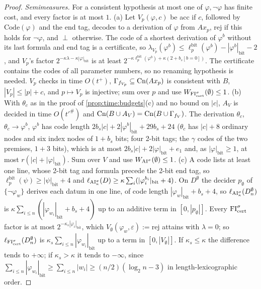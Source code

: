 \begin{proof}
\emph{Semimeasures.} For a consistent hypothesis at most one of $\varphi,\neg\varphi$ has finite cost, and every factor is at most $1$.
(a) Let $V_p(\varphi,c)$ be acc if $c$, followed by $\mathrm{Code}(\varphi)$ and the end tag, decodes to a derivation of $\varphi$ from $Ax_p$, rej if this holds for $\neg\varphi$, and $\perp$ otherwise. The code of a shortest derivation of $\varphi^b$ without its last formula and end tag is a certificate, so $\lambda_{V_p}(\varphi^b)\le\ell^{\mathrm{bit}}_p(\varphi^b)-|\varphi^b|_{\mathrm{bit}}-2$, and $V_p$'s factor $2^{-\kappa\lambda-\kappa|\varphi|_{\mathrm{bit}}}$ is at least $2^{-\kappa\ell^{\mathrm{bit}}_p(\varphi^b)+\kappa(2+b_s[b=0])}$. The certificate contains the codes of all parameter numbers, so no renaming hypothesis is needed. $V_p$ checks in time $O(t^+)$, $\Gamma_{f_{V_p}}\subseteq\mathrm{Cn}(Ax_p)$ is consistent with $B$, $|V_p|\le|p|+c$, and $p\mapsto V_p$ is injective; sum over $p$ and use $W_{\mathrm{FI}_{\mathrm{cert}}^\sigma}(\emptyset)\le1$.
(b) With $\theta_c$ as in the proof of \cref{prop:time:budgets}(c) and no bound on $|c|$, $A_V$ is decided in time $O(t'^\#)$ and $\mathrm{Cn}(B\cup A_V)=\mathrm{Cn}(B\cup\Gamma_{f_V})$. The derivation $\theta_c$, $\theta_c\to\varphi^b$, $\varphi^b$ has code length $2b_s|c|+2|\varphi^b|_{\mathrm{bit}}+29b_s+24$ ($\theta_c$ has $|c|+8$ ordinary nodes and six index nodes of $1+b_s$ bits; four 2-bit tags; the $\gamma$ codes of the two premises, $1+3$ bits), which is at most $2b_s|c|+2|\varphi|_{\mathrm{bit}}+e_1$ and, as $|\varphi|_{\mathrm{bit}}\ge1$, at most $r(|c|+|\varphi|_{\mathrm{bit}})$. Sum over $V$ and use $W_{\mathrm{AI}^\sigma}(\emptyset)\le1$.
(c) A code lists at least one line, whose 2-bit tag and formula precede the 2-bit end tag, so $\ell^{\mathrm{bit}}_p(\psi)\ge|\psi|_{\mathrm{bit}}+4$ and $\ell_{\mathrm{AI}^\sigma_\kappa}(D)\ge\kappa\sum_i(|\varphi_i^{b_i}|_{\mathrm{bit}}+4)$. On $D^\emptyset$ the decider $p_\emptyset$ of $\{\neg\varphi_w\}$ derives each datum in one line, of code length $|\varphi_w|_{\mathrm{bit}}+b_s+4$, so $\ell_{\mathrm{AI}^\sigma_\kappa}(D^\emptyset_n)$ is $\kappa\sum_{i\le n}(|\varphi_{w_i}|_{\mathrm{bit}}+b_s+4)$ up to an additive term in $[0,|p_\emptyset|]$. Every $\mathrm{FI}_{\mathrm{cert}}^\sigma$ factor is at most $2^{-\kappa_s|\varphi_i|_{\mathrm{bit}}}$, which $V_\emptyset(\varphi_w,\varepsilon):=\mathrm{rej}$ attains with $\lambda=0$; so $\ell_{\mathrm{FI}_{\mathrm{cert}}^\sigma}(D^\emptyset_n)$ is $\kappa_s\sum_{i\le n}|\varphi_{w_i}|_{\mathrm{bit}}$ up to a term in $[0,|V_\emptyset|]$. If $\kappa_s\le\kappa$ the difference tends to $+\infty$; if $\kappa_s>\kappa$ it tends to $-\infty$, since $\sum_{i\le n}|\varphi_{w_i}|_{\mathrm{bit}}\ge\sum_{i\le n}|w_i|\ge(n/2)(\log_2n-3)$ in length-lexicographic order.
\end{proof}

